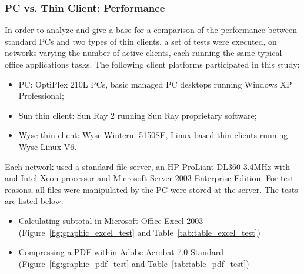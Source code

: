             \subsubsection*{PC vs. Thin Client: Performance}
                In order to analyze and give a base for a comparison of the performance between standard PCs and two types of thin clients, a set of tests were executed, on networks varying the number of active clients, each running the same typical office applications tasks. The following client platforms participated in this study:
                \begin{itemize}
                    \item PC: OptiPlex 210L PCs, basic managed PC desktops running Windows XP Professional;
                    \item Sun thin client: Sun Ray 2 running Sun Ray proprietary software;
                    \item Wyse thin client: Wyse Winterm 5150SE, Linux-based thin clients running Wyse Linux V6.
                \end{itemize}
                Each network used a standard file server, an HP ProLiant DL360 3.4MHz with and Intel Xeon processor and Microsoft Server 2003 Enterprise Edition. For test reasons, all files were manipulated by the PC were stored at the server. The tests are listed below:
                \begin{itemize}
                    \item Calculating subtotal in Microsoft Office Excel 2003 (Figure~\ref{fig:graphic_excel_test} and Table~\ref{tab:table_excel_test})
                    \item Compressing a PDF within Adobe Acrobat 7.0 Standard (Figure~\ref{fig:graphic_pdf_test} and Table~\ref{tab:table_pdf_test})
                \end{itemize}
                
